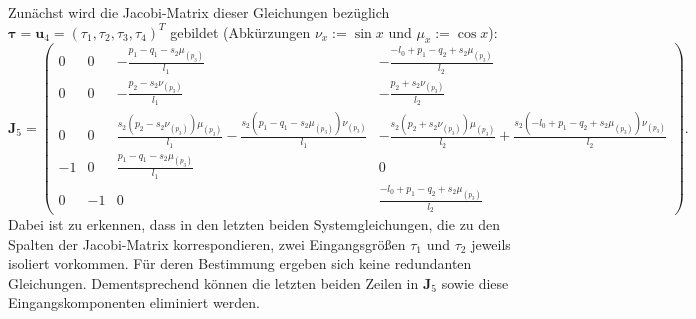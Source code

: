 Zunächst wird die Jacobi-Matrix dieser Gleichungen bezüglich $\boldsymbol{\tau} = \mathbf{u}_4 = (\tau_1, \tau_2, \tau_3, \tau_4)^T$ gebildet (Abkürzungen $\nu_x := \sin{x}$ und $\mu_x := \cos{x}$):
\begin{equation*}
	\mathbf{J}_5 = 
	\left(\begin{smallmatrix}
	0 & 0 & - \frac{p_{1} - q_{1} - s_{2} \mu_{\left(p_{3} \right)}}{l_{1}} & - \frac{- l_{0} + p_{1} - q_{2} + s_{2} \mu_{\left(p_{3} \right)}}{l_{2}}\\
	0 & 0 & - \frac{p_{2} - s_{2} \nu_{\left(p_{3} \right)}}{l_{1}} & - \frac{p_{2} + s_{2} \nu_{\left(p_{3} \right)}}{l_{2}}\\
	0 & 0 & \frac{s_{2} \left(p_{2} - s_{2} \nu_{\left(p_{3} \right)}\right) \mu_{\left(p_{3} \right)}}{l_{1}} - \frac{s_{2} \left(p_{1} - q_{1} - s_{2} \mu_{\left(p_{3} \right)}\right) \nu_{\left(p_{3} \right)}}{l_{1}} & - \frac{s_{2} \left(p_{2} + s_{2} \nu_{\left(p_{3} \right)}\right) \mu_{\left(p_{3} \right)}}{l_{2}} + \frac{s_{2} \left(- l_{0} + p_{1} - q_{2} + s_{2} \mu_{\left(p_{3} \right)}\right) \nu_{\left(p_{3} \right)}}{l_{2}}\\
	-1 & 0 & \frac{p_{1} - q_{1} - s_{2} \mu_{\left(p_{3} \right)}}{l_{1}} & 0\\
	0 & -1 & 0 & \frac{- l_{0} + p_{1} - q_{2} + s_{2} \mu_{\left(p_{3} \right)}}{l_{2}}
	\end{smallmatrix}\right).
\end{equation*}
Dabei ist zu erkennen, dass in den letzten beiden Systemgleichungen, die zu den  Spalten der Jacobi-Matrix korrespondieren, zwei Eingangsgrößen $\tau_{1}$ und $\tau_{2}$ jeweils isoliert vorkommen. Für deren Bestimmung ergeben sich keine redundanten Gleichungen. Dementsprechend können die letzten beiden Zeilen in $\mathbf{J}_5$ sowie diese Eingangskomponenten eliminiert werden. 

